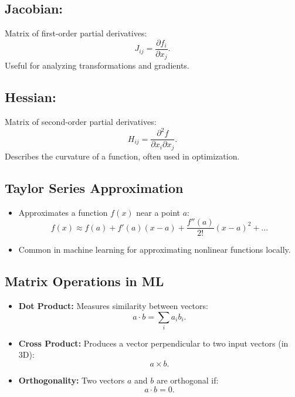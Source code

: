 \documentclass[12pt,a4paper]{article}
\begin{document}
\subsection{Jacobian:} Matrix of first-order partial derivatives:
    \[ J_{ij} = \frac{\partial f_i}{\partial x_j}. \]
    Useful for analyzing transformations and gradients.
\subsection{Hessian:} Matrix of second-order partial derivatives:
    \[ H_{ij} = \frac{\partial^2 f}{\partial x_i \partial x_j}. \]
    Describes the curvature of a function, often used in optimization.

\subsection{Taylor Series Approximation}
\begin{itemize}
    \item Approximates a function $f(x)$ near a point $a$:
    \[ f(x) \approx f(a) + f'(a)(x-a) + \frac{f''(a)}{2!}(x-a)^2 + \dots \]
    \item Common in machine learning for approximating nonlinear functions locally.
\end{itemize}

\subsection{Matrix Operations in ML}
\begin{itemize}
    \item \textbf{Dot Product:} Measures similarity between vectors:
    \[ a \cdot b = \sum_{i} a_i b_i. \]
    \item \textbf{Cross Product:} Produces a vector perpendicular to two input vectors (in 3D):
    \[ a \times b. \]
    \item \textbf{Orthogonality:} Two vectors $a$ and $b$ are orthogonal if:
    \[ a \cdot b = 0. \]
\end{itemize}
\end{document}
